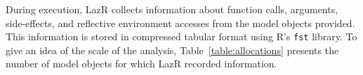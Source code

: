 \documentclass[review,nonacm,screen,acmsmall,anonymous=true]{acmart}
\renewcommand{\c}[1]{\lstinline |#1|\xspace}
\newcommand{\lazr}{{\sf LazR}\xspace}
\begin{document}

During execution, \lazr collects information about function calls, arguments,
side-effects, and reflective environment accesses from the model objects provided.
This information is stored in compressed tabular format using R's \c{fst}
library. To give an idea of the scale of the analysis,
Table~\ref{table:allocations} presents the number of model objects for which
\lazr recorded information.
\end{document}
